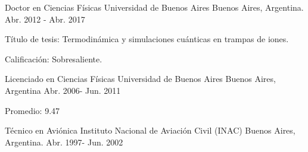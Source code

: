 

\begin{cventries}

  \cventry
    {Doctor en Ciencias Físicas} %
    {Universidad de Buenos Aires} %
    {Buenos Aires, Argentina.} %
    {Abr. 2012 - Abr. 2017} %
    {
      \begin{cvitems} %
        \item {Título de tesis: Termodinámica y simulaciones cuánticas en trampas de iones.}
        \item {Calificación: Sobresaliente.}
      \end{cvitems}
    }

  \cventry
    {Licenciado en Ciencias Físicas} %
    {Universidad de Buenos Aires} %
    {Buenos Aires, Argentina} %
    {Abr. 2006- Jun. 2011} %
    {
      \begin{cvitems} %
        \item {Promedio: 9.47}
      \end{cvitems}
    }

  \cventry
    {Técnico en Aviónica} %
    {Instituto Nacional de Aviación Civil (INAC)} %
    {Buenos Aires, Argentina.} %
    {Abr. 1997- Jun. 2002} %
    {
    }


\end{cventries}
